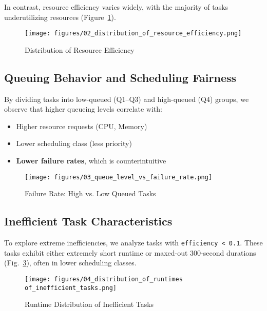 \documentclass[a4paper,12pt]{article}
\begin{document}
In contrast, resource efficiency varies widely, with the majority of tasks underutilizing resources (Figure~\ref{fig:eff-dist}).

\begin{figure}[htbp]
  \centering
  \texttt{[image: figures/02\_distribution\_of\_resource\_efficiency.png]}
  \caption{Distribution of Resource Efficiency}
  \label{fig:eff-dist}
\end{figure}

\subsection{Queuing Behavior and Scheduling Fairness}

By dividing tasks into low-queued (Q1--Q3) and high-queued (Q4) groups, we observe that higher queueing levels correlate with:

\begin{itemize}
  \item Higher resource requests (CPU, Memory)
  \item Lower scheduling class (less priority)
  \item \textbf{Lower failure rates}, which is counterintuitive
\end{itemize}

\begin{figure}[htbp]
  \centering
  \texttt{[image: figures/03\_queue\_level\_vs\_failure\_rate.png]}
  \caption{Failure Rate: High vs. Low Queued Tasks}
  \label{fig:queue-vs-fail}
\end{figure}

\subsection{Inefficient Task Characteristics}

To explore extreme inefficiencies, we analyze tasks with \texttt{efficiency < 0.1}. These tasks exhibit either extremely short runtime or maxed-out 300-second durations (Fig.~\ref{fig:ineff-runtime}), often in lower scheduling classes.

\begin{figure}[htbp]
  \centering
  \texttt{[image: figures/04\_distribution\_of\_runtimes of\_inefficient\_tasks.png]}
  \caption{Runtime Distribution of Inefficient Tasks}
  \label{fig:ineff-runtime}
\end{figure}
\end{document}
